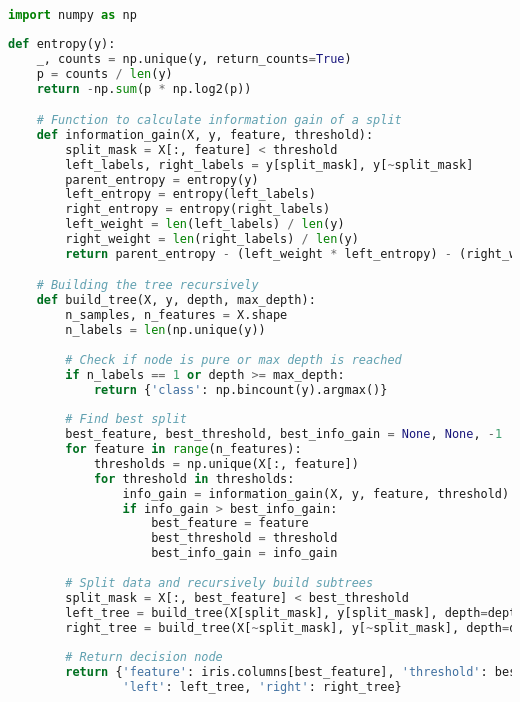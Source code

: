 \documentclass[12pt,a4paper]{article}
\begin{document}
\begin{lstlisting}[language=python, style = mystyle]
	  import numpy as np
\end{lstlisting}
\begin{lstlisting}[language=python, style = mystyle]
  def entropy(y):
    _, counts = np.unique(y, return_counts=True)
    p = counts / len(y)
    return -np.sum(p * np.log2(p))

    # Function to calculate information gain of a split
    def information_gain(X, y, feature, threshold):
        split_mask = X[:, feature] < threshold
        left_labels, right_labels = y[split_mask], y[~split_mask]
        parent_entropy = entropy(y)
        left_entropy = entropy(left_labels)
        right_entropy = entropy(right_labels)
        left_weight = len(left_labels) / len(y)
        right_weight = len(right_labels) / len(y)
        return parent_entropy - (left_weight * left_entropy) - (right_weight * right_entropy)

    # Building the tree recursively
    def build_tree(X, y, depth, max_depth):
        n_samples, n_features = X.shape
        n_labels = len(np.unique(y))
        
        # Check if node is pure or max depth is reached
        if n_labels == 1 or depth >= max_depth:
            return {'class': np.bincount(y).argmax()}
        
        # Find best split
        best_feature, best_threshold, best_info_gain = None, None, -1
        for feature in range(n_features):
            thresholds = np.unique(X[:, feature])
            for threshold in thresholds:
                info_gain = information_gain(X, y, feature, threshold)
                if info_gain > best_info_gain:
                    best_feature = feature
                    best_threshold = threshold
                    best_info_gain = info_gain
        
        # Split data and recursively build subtrees
        split_mask = X[:, best_feature] < best_threshold
        left_tree = build_tree(X[split_mask], y[split_mask], depth=depth+1, max_depth=max_depth)
        right_tree = build_tree(X[~split_mask], y[~split_mask], depth=depth+1, max_depth=max_depth)
        
        # Return decision node
        return {'feature': iris.columns[best_feature], 'threshold': best_threshold,
                'left': left_tree, 'right': right_tree}
\end{lstlisting}
\end{document}
